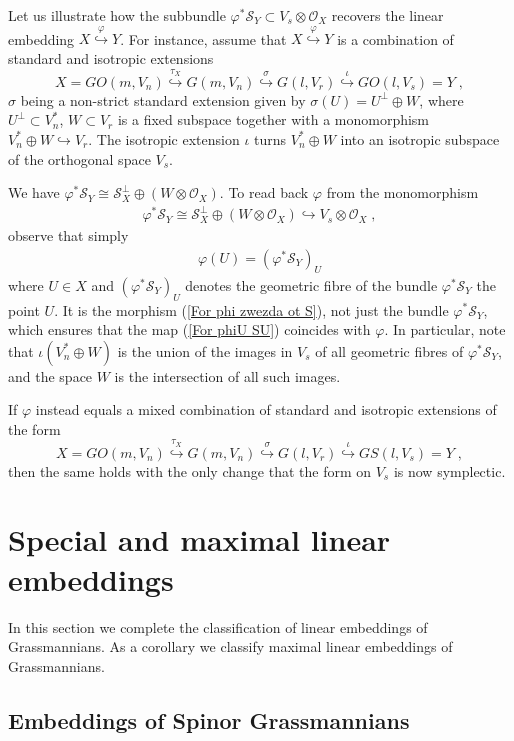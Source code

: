\documentclass[12pt]{amsart}
\def\hw  {\hookrightarrow}
\def\mc {\mathcal}
\begin{document}
Let us illustrate how the subbundle $\varphi^*\mc S_Y\subset V_s\otimes \mc O_X$ recovers the linear embedding $X\stackrel{\varphi}{\hw} Y$. For instance, assume that $X\stackrel{\varphi}{\hw} Y$ is a combination of standard and isotropic extensions
$$
X=GO(m,V_n) \stackrel{\tau_X}{\hw} G(m,V_n) \stackrel{\sigma}{\hw} G(l,V_r) \stackrel{\iota}{\hw} GO(l,V_s) = Y\;,
$$
$\sigma$ being a non-strict standard extension given by $\sigma(U)=U^\perp\oplus W$, where $U^\perp\subset V_n^*$, $W\subset V_r$ is a fixed subspace together with a monomorphism $V_n^*\oplus W \hw V_r$. The isotropic extension $\iota$ turns $V_n^*\oplus W$ into an isotropic subspace of the orthogonal space $V_s$. 

We have $\varphi^* \mc S_Y \cong \mc S^\perp_X \oplus (W\otimes \mc O_X)$. To read back $\varphi$ from the monomorphism 
\begin{gather}\label{For phi zwezda ot S}
\varphi^* \mc S_Y \cong \mc S^\perp_X \oplus (W\otimes \mc O_X) \hw V_s\otimes \mc O_X\;,
\end{gather}
observe that simply 
\begin{gather}\label{For phiU SU}
\varphi(U)=(\varphi^*\mc S_Y)_U
\end{gather}
where $U\in X$ and $(\varphi^*\mc S_Y)_U$ denotes the geometric fibre of the bundle $\varphi^*\mc S_Y$ the point $U$. It is the morphism (\ref{For phi zwezda ot S}), not just the bundle $\varphi^*\mc S_Y$, which ensures that the map (\ref{For phiU SU}) coincides with $\varphi$. In particular, note that $\iota(V_n^*\oplus W)$ is the union of the images in $V_s$ of all geometric fibres of $\varphi^*\mc S_Y$, and the space $W$ is the intersection of all such images.

If $\varphi$ instead equals a mixed combination of standard and isotropic extensions of the form
$$
X=GO(m,V_n) \stackrel{\tau_X}{\hw} G(m,V_n) \stackrel{\sigma}{\hw} G(l,V_r) \stackrel{\iota}{\hw} GS(l,V_s) = Y\;,
$$
then the same holds with the only change that the form on $V_s$ is now symplectic.


\section{Special and maximal linear embeddings}\label{Sec Special Emb}

In this section we complete the classification of linear embeddings of Grassmannians. As a corollary we classify maximal linear embeddings of Grassmannians.


\subsection{Embeddings of Spinor Grassmannians}\label{Sec SpinorGrass}
\end{document}
